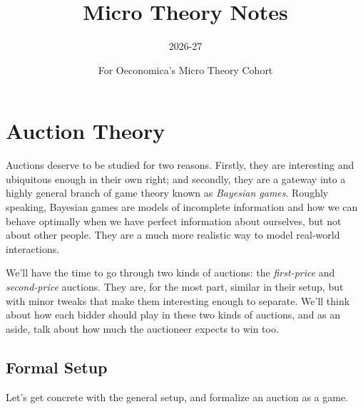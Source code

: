 \documentclass[12pt]{article}
\title{Micro Theory Notes}
\author{2026-27}
\date{For Oeconomica's Micro Theory Cohort}
\theoremstyle{definition}
\theoremstyle{remark}
\theoremstyle{plain}                          %
\begin{document}
\onehalfspacing

\maketitle

\section{Auction Theory}

Auctions deserve to be studied for two reasons. Firstly, they are interesting and ubiquitous enough in their own right; and secondly, they are a gateway into a highly general branch of game theory known as \textit{Bayesian games}. Roughly speaking, Bayesian games are models of incomplete information and how we can behave optimally when we have perfect information about ourselves, but not about other people. They are a much more realistic way to model real-world interactions.

We'll have the time to go through two kinds of auctions: the \emph{first-price} and \emph{second-price}
auctions. They are, for the most part, similar in their setup, but with minor tweaks that make them interesting enough to separate. We'll think about how each bidder should play in these two kinds of auctions, and as an aside, talk about how much the auctioneer expects to win too.

\subsection{Formal Setup}\label{sec:model}

Let's get concrete with the general setup, and formalize an auction as a game.
\end{document}
